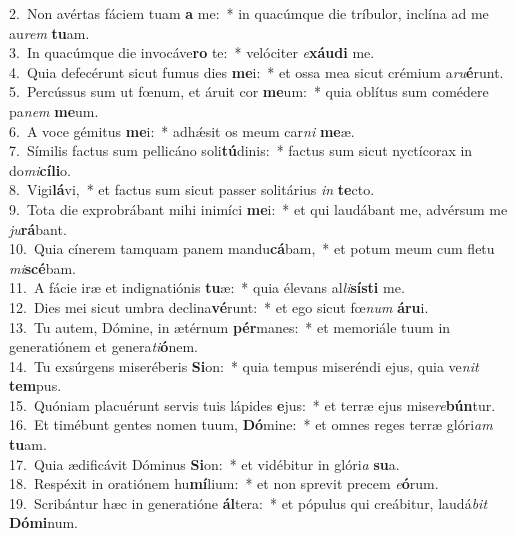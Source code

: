 {2.~}Non avértas fáciem tuam \textbf{a} me:~* in quacúmque die tríbulor, inclína ad me au\textit{rem} \textbf{tu}am.\\
{3.~}In quacúmque die invocáve\textbf{ro} te:~* velóciter \textit{e}\textbf{xáu}\textbf{di} me.\\
{4.~}Quia defecérunt sicut fumus dies \textbf{me}i:~* et ossa mea sicut crémium a\textit{ru}\textbf{é}runt.\\
{5.~}Percússus sum ut fœnum, et áruit cor \textbf{me}um:~* quia oblítus sum comédere pa\textit{nem} \textbf{me}um.\\
{6.~}A voce gémitus \textbf{me}i:~* adhǽsit os meum car\textit{ni} \textbf{me}æ.\\
{7.~}Símilis factus sum pellicáno soli\textbf{tú}dinis:~* factus sum sicut nyctícorax in do\textit{mi}\textbf{cí}\textbf{li}o.\\
{8.~}Vigi\textbf{lá}vi,~* et factus sum sicut passer solitárius \textit{in} \textbf{te}cto.\\
{9.~}Tota die exprobrábant mihi inimíci \textbf{me}i:~* et qui laudábant me, advérsum me \textit{ju}\textbf{rá}bant.\\
{10.~}Quia cínerem tamquam panem mandu\textbf{cá}bam,~* et potum meum cum fletu \textit{mi}\textbf{scé}bam.\\
{11.~}A fácie iræ et indignatiónis \textbf{tu}æ:~* quia élevans al\textit{li}\textbf{sí}\textbf{sti} me.\\
{12.~}Dies mei sicut umbra declina\textbf{vé}runt:~* et ego sicut fœ\textit{num} \textbf{á}\textbf{ru}i.\\
{13.~}Tu autem, Dómine, in ætérnum \textbf{pér}manes:~* et memoriále tuum in generatiónem et genera\textit{ti}\textbf{ó}nem.\\
{14.~}Tu exsúrgens miseréberis \textbf{Si}on:~* quia tempus miseréndi ejus, quia ve\textit{nit} \textbf{tem}pus.\\
{15.~}Quóniam placuérunt servis tuis lápides \textbf{e}jus:~* et terræ ejus mise\textit{re}\textbf{bún}tur.\\
{16.~}Et timébunt gentes nomen tuum, \textbf{Dó}mine:~* et omnes reges terræ glóri\textit{am} \textbf{tu}am.\\
{17.~}Quia ædificávit Dóminus \textbf{Si}on:~* et vidébitur in glóri\textit{a} \textbf{su}a.\\
{18.~}Respéxit in oratiónem hu\textbf{mí}lium:~* et non sprevit precem \textit{e}\textbf{ó}rum.\\
{19.~}Scribántur hæc in generatióne \textbf{ál}tera:~* et pópulus qui creábitur, laudá\textit{bit} \textbf{Dó}\textbf{mi}num.\\
